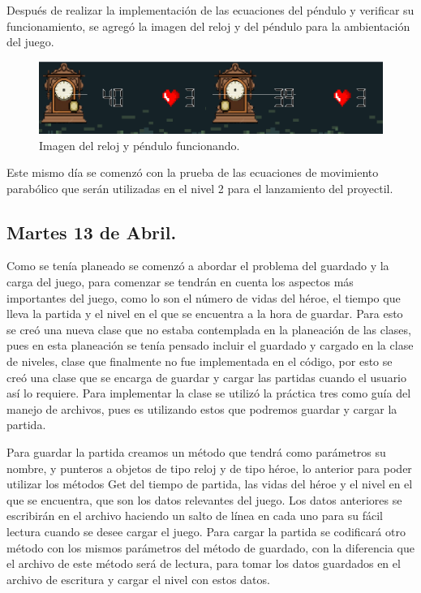 \documentclass{article}
\begin{document}
Después de realizar la implementación de las ecuaciones del péndulo y verificar su funcionamiento, se agregó la imagen del reloj y del péndulo para la ambientación del juego.

\newpage
\begin{figure}[h]
\includegraphics[scale=0.7]{Images/barra.png}
\centering
\caption{Imagen del reloj y péndulo funcionando.}
\label{fig:penduloreloj}
\end{figure}

Este mismo día se comenzó con la prueba de las ecuaciones de movimiento parabólico que serán utilizadas en el nivel 2 para el lanzamiento del proyectil.

\subsection{Martes 13 de Abril.}
Como se tenía planeado se comenzó a abordar el problema del guardado y la carga del juego, para comenzar se tendrán en cuenta los aspectos más importantes del juego, como lo son el número de vidas del héroe, el tiempo que lleva la partida y el nivel en el que se encuentra a la hora de guardar. Para esto se creó una nueva clase que no estaba contemplada en la planeación de las clases, pues en esta planeación se tenía pensado incluir el guardado y cargado en la clase de niveles, clase que finalmente no fue implementada en el código, por esto se creó una clase que se encarga de guardar y cargar las partidas cuando el usuario así lo requiere.
Para implementar la clase se utilizó la práctica tres como guía del manejo de archivos, pues es utilizando estos que podremos guardar y cargar la partida.

Para guardar la partida creamos un método que tendrá como parámetros su nombre, y punteros a objetos de tipo reloj y de tipo héroe, lo anterior para poder utilizar los métodos Get del tiempo de partida, las vidas del héroe y el nivel en el que se encuentra, que son los datos relevantes del juego. Los datos anteriores se escribirán en el archivo haciendo un salto de línea en cada uno para su fácil lectura cuando se desee cargar el juego.
Para cargar la partida se codificará otro método con los mismos parámetros del método de guardado, con la diferencia que el archivo de este método será de lectura, para tomar los datos guardados en el archivo de escritura y cargar el nivel con estos datos.
\end{document}
